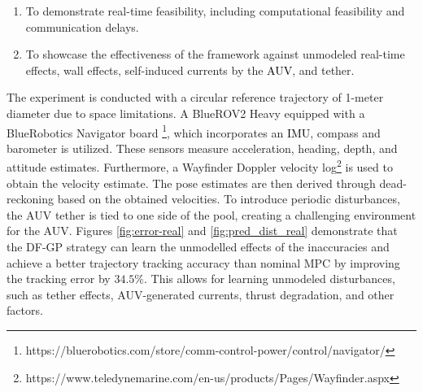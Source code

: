 \begin{enumerate}
    \item To demonstrate real-time feasibility, including computational feasibility and communication delays.
    \item To showcase the effectiveness of the framework against unmodeled real-time effects, wall effects, self-induced currents by the \textcolor{black}{\ac{AUV}}, and tether.
\end{enumerate}
The experiment is conducted with a circular reference trajectory of 1-meter diameter due to space limitations. A BlueROV2 Heavy equipped with a BlueRobotics Navigator board \footnote{https://bluerobotics.com/store/comm-control-power/control/navigator/}, which incorporates an \textcolor{black}{\ac{IMU}}, compass and barometer is utilized. These sensors measure acceleration, heading, depth, and attitude estimates. Furthermore, a Wayfinder Doppler velocity log\footnote{https://www.teledynemarine.com/en-us/products/Pages/Wayfinder.aspx} is used to obtain the velocity estimate. The pose estimates are then derived through dead-reckoning based on the obtained velocities. To introduce periodic disturbances, the \ac{AUV} tether is tied to one side of the pool, creating a challenging environment for the \ac{AUV}.  %
Figures \ref{fig:error-real} and \ref{fig:pred_dist_real} demonstrate that the \ac{DF-GP} strategy can learn the unmodelled effects of the inaccuracies and achieve a better trajectory tracking accuracy than nominal \ac{MPC} by improving the tracking error by $34.5\%$. This allows for learning unmodeled disturbances, such as tether effects, \ac{AUV}-generated currents, thrust degradation, and other factors.


